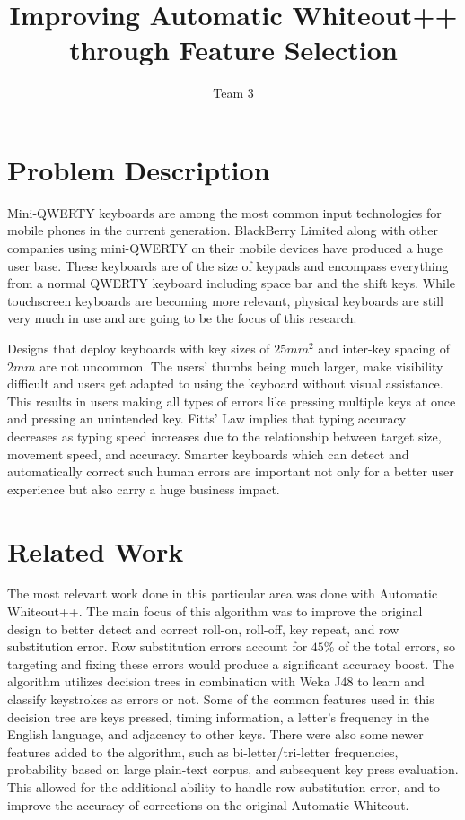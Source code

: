 \documentclass[letterpaper, 10 pt, conference]{ieeeconf}  %
\title{\LARGE \bf
Improving Automatic Whiteout++ through Feature Selection
}
\author{Team 3}
\begin{document}
\maketitle
\thispagestyle{empty}
\pagestyle{empty}
\nocite{*} %

\section{Problem Description}
Mini-QWERTY keyboards are among the most common input technologies for mobile phones in the current generation. BlackBerry Limited along with other companies using mini-QWERTY on their mobile devices have produced a huge user base. These keyboards are of the size of keypads and encompass everything from a normal QWERTY keyboard including space bar and the shift keys.  While touchscreen keyboards are becoming more relevant, physical keyboards are still very much in use and are going to be the focus of this research.

Designs that deploy keyboards with key sizes of $25 mm^{2}$ and inter-key spacing of $2 mm$\cite{clawson2006mobile} are not uncommon. The users’ thumbs being much larger, make visibility difficult and users get adapted to using the keyboard without visual assistance. This results in users making all types of errors like pressing multiple keys at once and pressing an unintended key. Fitts’ Law implies that typing accuracy decreases as typing speed increases due to the relationship between target size, movement speed, and accuracy\cite{soukoreff2004towards}.  Smarter keyboards which can detect and automatically correct such human errors are important not only for a better user experience but also carry a huge business impact.

\section{Related Work}
The most relevant work done in this particular area was done with Automatic Whiteout++.  The main focus of this algorithm was to improve the original design to better detect and correct roll-on, roll-off, key repeat, and row substitution error.  Row substitution errors account for $45\%$ of the total errors, so targeting and fixing these errors would produce a significant accuracy boost\cite{clawson2008automatic}.  The algorithm utilizes decision trees in combination with Weka J48 to learn and classify keystrokes as errors or not.  Some of the common features used in this decision tree are keys pressed, timing information, a letter’s frequency in the English language, and adjacency to other keys.  There were also some newer features added to the algorithm, such as bi-letter/tri-letter frequencies, probability based on large plain-text corpus, and subsequent key press evaluation.  This allowed for the additional ability to handle row substitution error, and to improve the accuracy of corrections on the original Automatic Whiteout.
\end{document}

